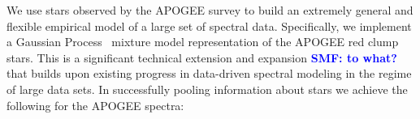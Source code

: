 \documentclass[a4paper,fleqn,usenatbib]{mnras}
\newcommand{\smf}[1]{\textbf{\textcolor{blue}{SMF: #1}}}
\begin{document}
We use stars observed by the APOGEE survey to build an extremely general and flexible empirical model of a large set of spectral data. %
Specifically, we implement a Gaussian Process~\citep{Rasmussen_Williams} mixture model representation of the APOGEE red clump stars. This is a significant technical extension and expansion \smf{to what?} that builds upon existing progress in data-driven spectral modeling in the regime of large data sets. %
In successfully pooling information about stars we achieve the following for the APOGEE spectra:
\end{document}
